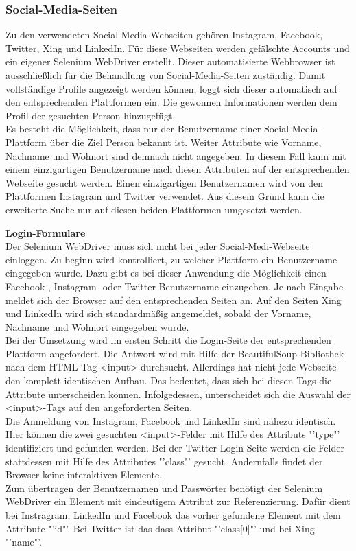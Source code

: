 			\subsubsection{Social-Media-Seiten}
			\label{subsubsec:SocialMediaSeiten}
			Zu den verwendeten Social-Media-Webseiten gehören Instagram, Facebook, Twitter, Xing und LinkedIn. Für diese Webseiten werden gefälschte Accounts und ein eigener Selenium WebDriver erstellt. Dieser automatisierte Webbrowser ist ausschließlich für die Behandlung von Social-Media-Seiten zuständig. Damit vollständige Profile angezeigt werden können, loggt sich dieser automatisch auf den entsprechenden Plattformen ein. Die gewonnen Informationen werden dem Profil der gesuchten Person hinzugefügt.\\
			Es besteht die Möglichkeit, dass nur der Benutzername einer Social-Media-Plattform über die Ziel Person bekannt ist. Weiter Attribute wie Vorname, Nachname und Wohnort sind demnach nicht angegeben. In diesem Fall kann mit einem einzigartigen Benutzername nach diesen Attributen auf der entsprechenden Webseite gesucht werden. Einen einzigartigen Benutzernamen wird von den Plattformen Instagram und Twitter verwendet. Aus diesem Grund kann die erweiterte Suche nur auf diesen beiden Plattformen umgesetzt werden.
			
			\textbf{Login-Formulare}\\
			Der Selenium WebDriver muss sich nicht bei jeder Social-Medi-Webseite einloggen. Zu beginn wird kontrolliert, zu welcher Plattform ein Benutzername eingegeben wurde. Dazu gibt es bei dieser Anwendung die Möglichkeit einen Facebook-, Instagram- oder Twitter-Benutzername einzugeben. Je nach Eingabe meldet sich der Browser auf den entsprechenden Seiten an. Auf den Seiten Xing und LinkedIn wird sich standardmäßig  angemeldet, sobald der Vorname, Nachname und Wohnort eingegeben wurde.\\
			Bei der Umsetzung wird im ersten Schritt die Login-Seite der entsprechenden Plattform angefordert. Die Antwort wird mit Hilfe der BeautifulSoup-Bibliothek nach dem HTML-Tag <input> durchsucht. Allerdings hat nicht jede Webseite den komplett identischen Aufbau. Das bedeutet, dass sich bei diesen Tags die Attribute unterscheiden können. Infolgedessen, unterscheidet sich die Auswahl der <input>-Tags auf den angeforderten Seiten.\\
			Die Anmeldung von Instagram, Facebook und LinkedIn sind nahezu identisch. Hier können die zwei gesuchten <input>-Felder mit Hilfe des Attributs "'type"' identifiziert und gefunden werden. Bei der Twitter-Login-Seite werden die Felder stattdessen mit Hilfe des Attributes "'class"' gesucht. Andernfalls findet der Browser keine interaktiven Elemente.\\
			Zum übertragen der Benutzernamen und Passwörter benötigt der Selenium WebDriver ein Element mit eindeutigem Attribut zur Referenzierung. Dafür dient bei Instragram, LinkedIn und Facebook das vorher gefundene Element mit dem Attribute "'id"'. Bei Twitter ist das dass Attribut "'class[0]"' und bei Xing "'name"'.
			 
